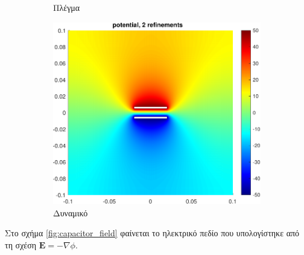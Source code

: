 \documentclass[10pt, letterpaper]{article}
\begin{document}
\begin{figure}[h!]
\begin{subfigure}[b]{0.3\textwidth}
      \caption{Πλέγμα}
      \label{fig:capacitor_mesh}
  \end{subfigure}
  \hfill
  \begin{subfigure}[b]{0.33\textwidth}
    \centering
    \includegraphics[width=\textwidth]{capacitor_potential_2_domain:5.pdf}
    \caption{Δυναμικό}
    \label{fig:capacitor_potential}
\end{subfigure}
  \caption{}
  \label{}
\end{figure}

Στο σχήμα \ref{fig:capacitor_field} φαίνεται το ηλεκτρικό πεδίο που υπολογίστηκε από τη σχέση $\mathbf{E} = - \nabla \phi$. 
\end{document}
